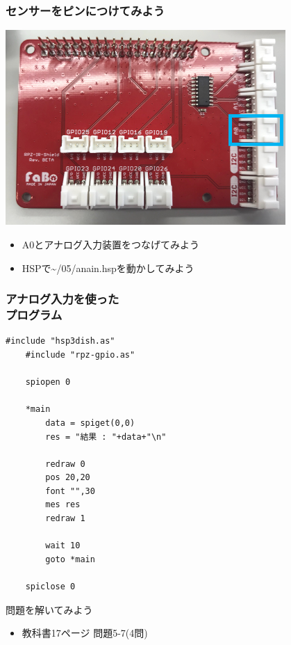\begin{frame}
    \frametitle{センサーをピンにつけてみよう}
    \begin{center}
        \includegraphics[width=0.8\textwidth]{images/chap05/text05-img030.png}
        \begin{itemize}
            \item A0とアナログ入力装置をつなげてみよう
            \item HSPで\textasciitilde/05/anain.hspを動かしてみよう
        \end{itemize}
    \end{center}
\end{frame}

\begin{frame}[fragile]
    \frametitle{アナログ入力を使った\\プログラム}
    \begin{lstlisting}[title=\textasciitilde/05/anain.hsp]
    #include "hsp3dish.as"
    #include "rpz-gpio.as"

    spiopen 0

    *main
	    data = spiget(0,0)
	    res = "結果 : "+data+"\n"

	    redraw 0
	    pos 20,20
	    font "",30
	    mes res
	    redraw 1

	    wait 10
	    goto *main

    spiclose 0
    \end{lstlisting}
\end{frame}

\begin{frame}[fragile]
    \begin{exampleblock}{問題を解いてみよう}
    \begin{itemize}
        \item 教科書17ページ 問題5-7(4問)
    \end{itemize}
    \end{exampleblock}
\end{frame}
